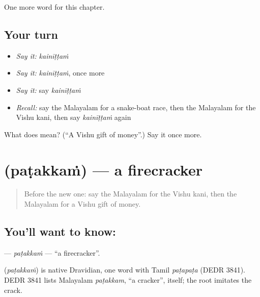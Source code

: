 \begin{grammarlens}[title={What you've built}]
One more word for this chapter.
\end{grammarlens}

\subsection*{Your turn}
\begin{itemize}
\raggedright
  \item \emph{Say it:} \emph{kainīṭṭaṁ}
  \item \emph{Say it:} \emph{kainīṭṭaṁ}, once more
  \item \emph{Say it:} say \emph{kainīṭṭaṁ}
  \item \emph{Recall:} say the Malayalam for a snake-boat race, then the Malayalam for the Vishu kani, then say \emph{kainīṭṭaṁ} again
\end{itemize}

\begin{tcolorbox}[breakable,colback=teal!4,colframe=teal!35!black,title={Before you move on}]
What does  mean? (\textquotedblleft{}A Vishu gift of money\textquotedblright{}.) Say it once more.
\end{tcolorbox}
\section[\texorpdfstring{\ml{പടക്കം} (paṭakkaṁ)}{പടക്കം (paṭakkaṁ)}]{ (paṭakkaṁ) — a firecracker}

\label{lesson:ML-C252-patakkam}



\begin{quote}
Before the new one: say the Malayalam for the Vishu kani, then the Malayalam for a Vishu gift of money.
\end{quote}

\subsection*{You'll want to know: }
\textbf{} — \emph{paṭakkaṁ} — \textquotedblleft{}a firecracker\textquotedblright{}.

\begin{cousinweb}
\textbf{} (\emph{paṭakkaṁ}) is native Dravidian, one word with Tamil \emph{paṭapaṭa} (DEDR 3841). DEDR 3841 lists Malayalam \emph{paṭakkam}, \textquotedblleft{}a cracker\textquotedblright{}, itself; the root imitates the crack.
\end{cousinweb}

